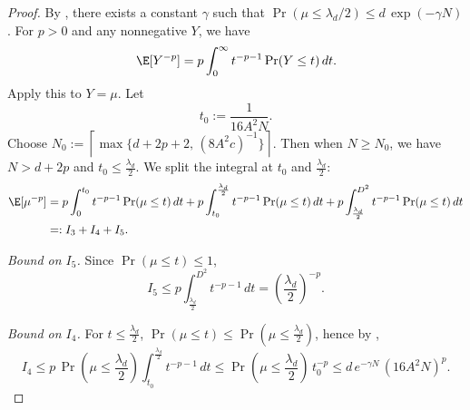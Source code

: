 \begin{proof}
By , there exists a constant $\gamma$ such that $\Pr(\mu\le \lambda_d/2)\le d\,\exp(-\gamma N)$.
For $p>0$ and any nonnegative $Y$, we have
\[
\E[Y^{-p}] = p\int_0^\infty t^{-p-1}\Pr(Y\le t)\,dt.
\]
Apply this to $Y=\mu$. Let
\[
t_0:=\frac{1}{16A^2N}.
\]
Choose $N_0:=\left\lceil\max\{d+2p+2,\,(8A^2c)^{-1}\}\right\rceil$. Then when $N\geq N_0$, we have $N>d+2p$ and $t_0\le \frac{\lambda_d}{2}$.
We split the integral at $t_0$ and $\frac{\lambda_d}{2}$:
\begin{align*}
\E[\mu^{-p}]
&= p\int_0^{t_0} t^{-p-1}\Pr(\mu\le t)\,dt
+ p\int_{t_0}^{\frac{\lambda_d}{2}} t^{-p-1}\Pr(\mu\le t)\,dt
+ p\int_{\frac{\lambda_d}{2}}^{D^2} t^{-p-1}\Pr(\mu\le t)\,dt \\
&=: I_3+I_4+I_5.
\end{align*}

\emph{Bound on $I_5$.} Since $\Pr(\mu\le t)\le 1$,
\[
I_5 \le p\int_{\frac{\lambda_d}{2}}^{D^2} t^{-p-1}\,dt = (\frac{\lambda_d}{2})^{-p}.
\]

\emph{Bound on $I_4$.} For $t\le \frac{\lambda_d}{2}$, $\Pr(\mu\le t)\le \Pr(\mu\le \frac{\lambda_d}{2})$, hence by ,
\[
I_4 \le p\,\Pr(\mu\le \frac{\lambda_d}{2})\int_{t_0}^{\frac{\lambda_d}{2}} t^{-p-1}\,dt
\le \Pr(\mu\le \frac{\lambda_d}{2})\,t_0^{-p}
\le d\,e^{-\gamma N}\,(16A^2N)^p.
\]


\end{proof}
